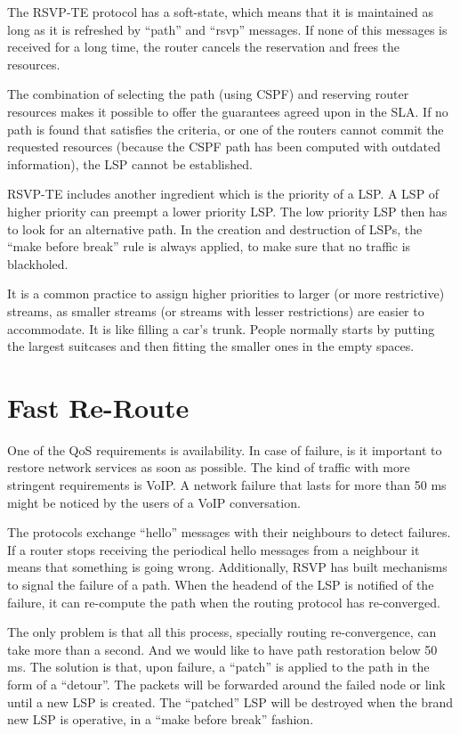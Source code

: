 The RSVP-TE protocol has a soft-state, which means that it is maintained as long as it is refreshed by ``path'' and ``rsvp'' messages.
If none of this messages is received for a long time, the router cancels the reservation and frees the resources.

The combination of selecting the path (using CSPF) and reserving router resources makes it possible to offer the guarantees agreed upon in the SLA.
If no path is found that satisfies the criteria, or one of the routers cannot commit the requested resources (because the CSPF path has been computed with outdated information), the LSP cannot be established.

RSVP-TE includes another ingredient which is the priority of a LSP.
A LSP of higher priority can preempt a lower priority LSP.
The low priority LSP then has to look for an alternative path.
In the creation and destruction of LSPs, the ``make before break'' rule is always applied, to make sure that no traffic is blackholed.

It is a common practice to assign higher priorities to larger (or more restrictive) streams, as smaller streams (or streams with lesser restrictions) are easier to accommodate.
It is like filling a car's trunk. 
People normally starts by putting the largest suitcases and then fitting the smaller ones in the empty spaces.

\section{Fast Re-Route}

One of the QoS requirements is availability.
In case of failure, is it important to restore network services as soon as possible.
The kind of traffic with more stringent requirements is VoIP.
A network failure that lasts for more than 50 ms might be noticed by the users of a VoIP conversation.

The protocols exchange ``hello'' messages with their neighbours to detect failures.
If a router stops receiving the periodical hello messages from a neighbour it means that something is going wrong.
Additionally, RSVP has built mechanisms to signal the failure of a path.
When the headend of the LSP is notified of the failure, it can re-compute the path when the routing protocol has re-converged.

The only problem is that all this process, specially routing re-convergence, can take more than a second.
And we would like to have path restoration below 50 ms.
The solution is that, upon failure, a ``patch'' is applied to the path in the form of a ``detour''.
The packets will be forwarded around the failed node or link until a new LSP is created.
The ``patched'' LSP will be destroyed when the brand new LSP is operative, in a ``make before break'' fashion.

